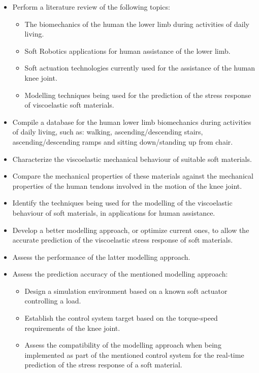 \begin{itemize}
    \item Perform a literature review of the following topics:
    \begin{itemize}
        \item The biomechanics of the human the lower limb during activities of daily living.
        \item Soft Robotics applications for human assistance of the lower limb.
        \item Soft actuation technologies currently used for the assistance of the human knee joint.
        \item Modelling techniques being used for the prediction of the stress response of viscoelastic soft materials.
    \end{itemize}
    \item Compile a database for the human lower limb biomechanics during activities of daily living, such as: walking, ascending/descending stairs, ascending/descending ramps and sitting down/standing up from chair.
    \item Characterize the viscoelastic mechanical behaviour of suitable soft materials.
    \item Compare the mechanical properties of these materials against the mechanical properties of the human tendons involved in the motion of the knee joint.
    \item Identify the techniques being used for the modelling of the viscoelastic behaviour of soft materials, in applications for human assistance.
    \item Develop a better modelling approach, or optimize current ones, to allow the accurate prediction of the viscoelastic stress response of soft materials.
    \item Assess the performance of the latter modelling approach.
    \item Assess the prediction accuracy of the mentioned modelling approach:
    \begin{itemize}
        \item Design a simulation environment based on a known soft actuator controlling a load.
        \item Establish the control system target based on the torque-speed requirements of the knee joint.
        \item Assess the compatibility of the modelling approach when being implemented as part of the mentioned control system for the real-time prediction of the stress response of a soft material.
    \end{itemize}
\end{itemize}

